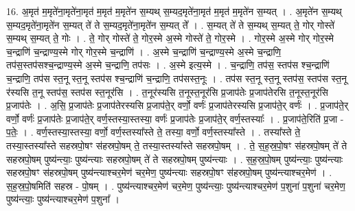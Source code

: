 \documentclass[17pt]{extarticle}
\begin{document}
16. अ॒मृत॑ म॒मृते॑ना॒मृते॑ना॒मृत॑ म॒मृत॑ म॒मृते॑न स॒म्यथ् स॒म्यद॒मृते॑ना॒मृत॑ म॒मृत॑ म॒मृते॑न स॒म्यत् । . अ॒मृते॑न स॒म्यथ् स॒म्यद॒मृते॑ना॒मृते॑न स॒म्यत् ते॑ ते स॒म्यद॒मृते॑ना॒मृते॑न स॒म्यत् ते᳚ । . स॒म्यत् ते॑ ते स॒म्यथ् स॒म्यत् ते॒ गोर् गोस्ते॑ स॒म्यथ् स॒म्यत् ते॒ गोः । . ते॒ गोर् गोस्ते॑ ते॒ गोर॒स्मे अ॒स्मे गोस्ते॑ ते॒ गोर॒स्मे । . गोर॒स्मे अ॒स्मे गोर् गोर॒स्मे च॒न्द्राणि॑ च॒न्द्राण्य॒स्मे गोर् गोर॒स्मे च॒न्द्राणि॑ । . अ॒स्मे च॒न्द्राणि॑ च॒न्द्राण्य॒स्मे अ॒स्मे च॒न्द्राणि॒ तप॑स॒स्तप॑सश्च॒न्द्राण्य॒स्मे अ॒स्मे च॒न्द्राणि॒ तप॑सः । . अ॒स्मे इत्य॒स्मे । . च॒न्द्राणि॒ तप॑स॒ स्तप॑स श्च॒न्द्राणि॑ च॒न्द्राणि॒ तप॑स स्त॒नू स्त॒नू स्तप॑स श्च॒न्द्राणि॑ च॒न्द्राणि॒ तप॑सस्त॒नूः । . तप॑स स्त॒नू स्त॒नू स्तप॑स॒ स्तप॑स स्त॒नू र॑स्यसि त॒नू स्तप॑स॒ स्तप॑स स्त॒नूर॑सि । . त॒नूर॑स्यसि त॒नूस्त॒नूर॑सि प्र॒जाप॑तेः प्र॒जाप॑तेरसि त॒नूस्त॒नूर॑सि प्र॒जाप॑तेः । . अ॒सि॒ प्र॒जाप॑तेः प्र॒जाप॑तेरस्यसि प्र॒जाप॑ते॒र् वर्णो॒ वर्णः॑ प्र॒जाप॑तेरस्यसि प्र॒जाप॑ते॒र् वर्णः॑ । . प्र॒जाप॑ते॒र् वर्णो॒ वर्णः॑ प्र॒जाप॑तेः प्र॒जाप॑ते॒र् वर्ण॒स्तस्या॒स्तस्या॒ वर्णः॑ प्र॒जाप॑तेः प्र॒जाप॑ते॒र् वर्ण॒स्तस्याः᳚ । . प्र॒जाप॑ते॒रिति॑ प्र॒जा - प॒तेः॒ । . वर्ण॒स्तस्या॒स्तस्या॒ वर्णो॒ वर्ण॒स्तस्या᳚स्ते ते॒ तस्या॒ वर्णो॒ वर्ण॒स्तस्या᳚स्ते । . तस्या᳚स्ते ते॒ तस्या॒स्तस्या᳚स्ते सहस्रपो॒षꣳ स॑हस्रपो॒षम् ते॒ तस्या॒स्तस्या᳚स्ते सहस्रपो॒षम् । . ते॒ स॒ह॒स्र॒पो॒षꣳ स॑हस्रपो॒षम् ते॑ ते सहस्रपो॒षम् पुष्य॑न्त्याः॒ पुष्य॑न्त्याः सहस्रपो॒षम् ते॑ ते सहस्रपो॒षम् पुष्य॑न्त्याः । . स॒ह॒स्र॒पो॒षम् पुष्य॑न्त्याः॒ पुष्य॑न्त्याः सहस्रपो॒षꣳ स॑हस्रपो॒षम् पुष्य॑न्त्याश्चर॒मेण॑ चर॒मेण॒ पुष्य॑न्त्याः सहस्रपो॒षꣳ स॑हस्रपो॒षम् पुष्य॑न्त्याश्चर॒मेण॑ । . स॒ह॒स्र॒पो॒षमिति॑ सहस्र - पो॒षम् । . पुष्य॑न्त्याश्चर॒मेण॑ चर॒मेण॒ पुष्य॑न्त्याः॒ पुष्य॑न्त्याश्चर॒मेण॑ प॒शुना॑ प॒शुना॑ चर॒मेण॒ पुष्य॑न्त्याः॒ पुष्य॑न्त्याश्चर॒मेण॑ प॒शुना᳚ । \newline
\end{document}
